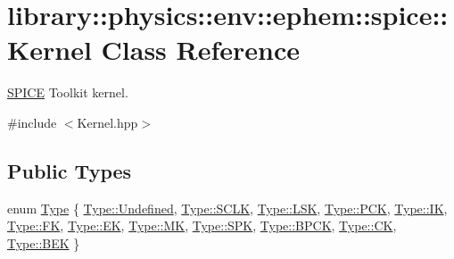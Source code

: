 \hypertarget{classlibrary_1_1physics_1_1env_1_1ephem_1_1spice_1_1_kernel}{}\section{library\+:\+:physics\+:\+:env\+:\+:ephem\+:\+:spice\+:\+:Kernel Class Reference}
\label{classlibrary_1_1physics_1_1env_1_1ephem_1_1spice_1_1_kernel}


\hyperlink{classlibrary_1_1physics_1_1env_1_1ephem_1_1_s_p_i_c_e}{S\+P\+I\+CE} Toolkit kernel.  




{\ttfamily \#include $<$Kernel.\+hpp$>$}

\subsection*{Public Types}
\begin{DoxyCompactItemize}
\item 
enum \hyperlink{classlibrary_1_1physics_1_1env_1_1ephem_1_1spice_1_1_kernel_ab28fd08b98057f635ee6a0e75b59fae6}{Type} \{ \newline
\hyperlink{classlibrary_1_1physics_1_1env_1_1ephem_1_1spice_1_1_kernel_ab28fd08b98057f635ee6a0e75b59fae6aec0fc0100c4fc1ce4eea230c3dc10360}{Type\+::\+Undefined}, 
\hyperlink{classlibrary_1_1physics_1_1env_1_1ephem_1_1spice_1_1_kernel_ab28fd08b98057f635ee6a0e75b59fae6ae5ebe7b9d4b13b67cb85ac2febe4aca2}{Type\+::\+S\+C\+LK}, 
\hyperlink{classlibrary_1_1physics_1_1env_1_1ephem_1_1spice_1_1_kernel_ab28fd08b98057f635ee6a0e75b59fae6a1352b10452a6331f4858173133cad49d}{Type\+::\+L\+SK}, 
\hyperlink{classlibrary_1_1physics_1_1env_1_1ephem_1_1spice_1_1_kernel_ab28fd08b98057f635ee6a0e75b59fae6abed028f19aa93adb7f45e064155e5278}{Type\+::\+P\+CK}, 
\newline
\hyperlink{classlibrary_1_1physics_1_1env_1_1ephem_1_1spice_1_1_kernel_ab28fd08b98057f635ee6a0e75b59fae6a7ab2200d24b19f1824cef3f53b5b69ca}{Type\+::\+IK}, 
\hyperlink{classlibrary_1_1physics_1_1env_1_1ephem_1_1spice_1_1_kernel_ab28fd08b98057f635ee6a0e75b59fae6a8c8ba29dafd95af91e280d1e80b81773}{Type\+::\+FK}, 
\hyperlink{classlibrary_1_1physics_1_1env_1_1ephem_1_1spice_1_1_kernel_ab28fd08b98057f635ee6a0e75b59fae6a6aa451b53d492a8f5a2fa1fa2855be8b}{Type\+::\+EK}, 
\hyperlink{classlibrary_1_1physics_1_1env_1_1ephem_1_1spice_1_1_kernel_ab28fd08b98057f635ee6a0e75b59fae6afbd1e7ba9564863b88d5c43cb833afaf}{Type\+::\+MK}, 
\newline
\hyperlink{classlibrary_1_1physics_1_1env_1_1ephem_1_1spice_1_1_kernel_ab28fd08b98057f635ee6a0e75b59fae6aa77fe9806504467c944718a3ce1ed5cb}{Type\+::\+S\+PK}, 
\hyperlink{classlibrary_1_1physics_1_1env_1_1ephem_1_1spice_1_1_kernel_ab28fd08b98057f635ee6a0e75b59fae6a357e2ff99b2ce7d86f78fca1353088ec}{Type\+::\+B\+P\+CK}, 
\hyperlink{classlibrary_1_1physics_1_1env_1_1ephem_1_1spice_1_1_kernel_ab28fd08b98057f635ee6a0e75b59fae6a534ac75c2e8ac3e3fe7bc32bb8c6e34a}{Type\+::\+CK}, 
\hyperlink{classlibrary_1_1physics_1_1env_1_1ephem_1_1spice_1_1_kernel_ab28fd08b98057f635ee6a0e75b59fae6a23d71b8d68c6f4869b29ed158e97c88a}{Type\+::\+B\+EK}
 \}
\end{DoxyCompactItemize}
